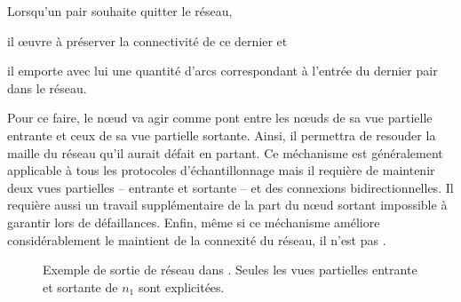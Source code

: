 \begin{itemize}
  Lorsqu'un pair souhaite quitter le réseau, 
  \begin{inparaenum}[(i)]
  \item il œuvre à préserver la connectivité de ce dernier et
  \item il emporte avec lui une quantité d'arcs correspondant à l'entrée du
    dernier pair dans le réseau.
  \end{inparaenum}
  Pour ce faire, le nœud va agir comme pont entre les nœuds de sa vue partielle
  entrante et ceux de sa vue partielle sortante. Ainsi, il permettra de resouder
  la maille du réseau qu'il aurait défait en partant. Ce méchanisme est
  généralement applicable à tous les protocoles d'échantillonnage mais il
  requière de maintenir deux vues partielles -- entrante et sortante -- et des
  connexions bidirectionnelles. Il requière aussi un travail supplémentaire de
  la part du nœud sortant impossible à garantir lors de défaillances. Enfin,
  même si ce méchanisme améliore considérablement le maintient de la connexité
  du réseau, il n'est pas .
  

  \begin{figure}
    \centering {}
    \hspace{45pt}
    \caption{\label{net:fig:scampexample} Exemple de sortie de réseau dans
      \SCAMP. Seules les vues partielles entrante et sortante de $n_1$ sont
      explicitées.}
  \end{figure}

  

\end{itemize}


